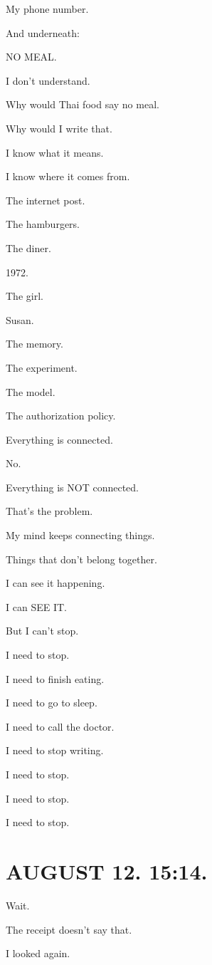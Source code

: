 \documentclass[11pt,oneside]{book}
\begin{document}
My phone number.

And underneath:

NO MEAL.

I don't understand.

Why would Thai food say no meal.

Why would I write that.

I know what it means.

I know where it comes from.

The internet post.

The hamburgers.

The diner.

1972.

The girl.

Susan.

The memory.

The experiment.

The model.

The authorization policy.

Everything is connected.

No.

Everything is NOT connected.

That's the problem.

My mind keeps connecting things.

Things that don't belong together.

I can see it happening.

I can SEE IT.

But I can't stop.

I need to stop.

I need to finish eating.

I need to go to sleep.

I need to call the doctor.

I need to stop writing.

I need to stop.

I need to stop.

I need to stop.

\section*{AUGUST 12. 15:14.}

Wait.

The receipt doesn't say that.

I looked again.
\end{document}
